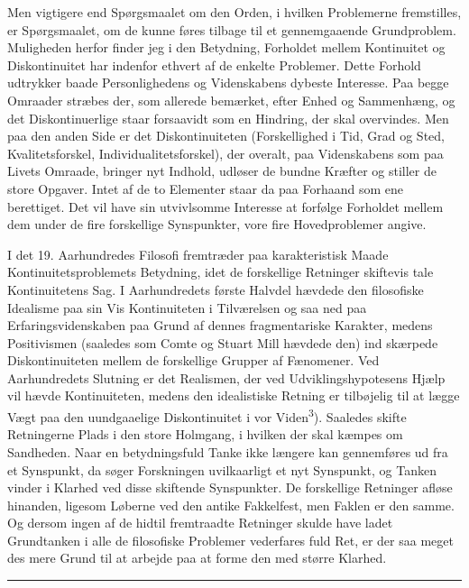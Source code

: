 \documentclass[12pt,a4paper,openany]{book}
\newcommand{\opage}[1]{\marginnote{\footnotesize\textit{[#1]}}}
\begin{document}
Men vigtigere end Spørgsmaalet om den Orden, i hvilken Problemerne fremstilles,
er Spørgsmaalet, om de kunne føres tilbage til et gennemgaaende Grundproblem.
Muligheden herfor finder jeg i den Betydning, Forholdet mellem Kontinuitet og
Diskontinuitet har indenfor ethvert af de enkelte Problemer. Dette Forhold
udtrykker baade Personlighedens og Videnskabens dybeste Interesse. Paa begge
Omraader stræbes der, som allerede bemærket, efter Enhed og Sammenhæng, og det
Diskontinuerlige staar forsaavidt som en Hindring, der skal overvindes. Men paa
den anden Side er det Diskontinuiteten (Forskellighed i Tid, Grad og Sted,
Kvalitetsforskel, Individualitetsforskel), der overalt, paa Videnskabens som
paa Livets Omraade, bringer nyt Indhold, udløser de bundne Kræfter og stiller
de store Opgaver. Intet af de to Elementer staar da paa Forhaand som ene
berettiget. Det vil have sin utvivlsomme Interesse at forfølge Forholdet mellem
dem under de fire forskellige Synspunkter, vore fire Hovedproblemer angive.

I det 19. Aarhundredes Filosofi fremtræder paa karakteristisk Maade
Kontinuitetsproblemets Betydning, idet de forskellige Retninger skiftevis tale
Kontinuitetens Sag. I Aarhundredets første Halvdel hævdede den filosofiske
Idealisme paa sin Vis Kontinuiteten i Tilværelsen og saa ned paa
Erfaringsvidenskaben paa Grund af dennes fragmentariske Karakter, medens
Positivismen (saaledes som Comte og Stuart Mill hævdede den) ind%
\opage{5}skærpede Diskontinuiteten mellem de forskellige Grupper af Fænomener.
Ved Aarhundredets Slutning er det Realismen, der ved Udviklingshypotesens Hjælp
vil hævde Kontinuiteten, medens den idealistiske Retning er tilbøjelig til at
lægge Vægt paa den uundgaaelige Diskontinuitet i vor Viden\textsuperscript{3}).
Saaledes skifte Retningerne Plads i den store Holmgang, i hvilken der skal
kæmpes om Sandheden. Naar en betydningsfuld Tanke ikke længere kan gennemføres
ud fra et Synspunkt, da søger Forskningen uvilkaarligt et nyt Synspunkt, og
Tanken vinder i Klarhed ved disse skiftende Synspunkter. De forskellige
Retninger afløse hinanden, ligesom Løberne ved den antike Fakkelfest, men
Faklen er den samme. Og dersom ingen af de hidtil fremtraadte Retninger skulde
have ladet Grundtanken i alle de filosofiske Problemer vederfares fuld Ret, er
der saa meget des mere Grund til at arbejde paa at forme den med større Klarhed.

\begin{center}\rule{2cm}{0.4pt}\end{center}
\end{document}
